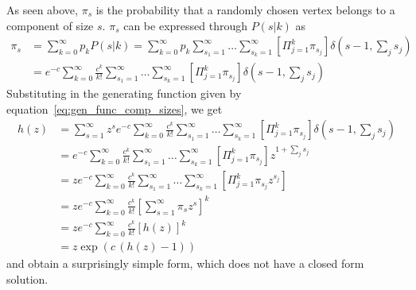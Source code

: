As seen above, $\pi_s$ is the probability that a randomly chosen vertex belongs to a component of size $s$.
$\pi_s$ can be expressed through $P(s|k)$ as
\begin{align}
	\pi_s & = \sum_{k=0}^\infty p_k P(s| k) = \sum_{k=0}^\infty p_k \sum_{s_1 = 1}^{\infty} \ldots \sum_{s_k = 1}^{\infty} \left[ \Pi_{j=1}^k \pi_{s_j} \right] \delta(s-1, \sum_j s_j) \\
	      & = e^{-c} \sum_{k=0}^\infty \frac{c^k}{k!} \sum_{s_1 = 1}^{\infty} \ldots \sum_{s_k = 1}^{\infty} \left[ \Pi_{j=1}^k \pi_{s_j} \right] \delta(s-1, \sum_j s_j)
\end{align}
Substituting in the generating function given by equation~\ref{eq:gen_func_comp_sizes}, we get
\begin{align}
	h(z) & = \sum_{s=1}^{\infty} z^s e^{-c} \sum_{k=0}^\infty \frac{c^k}{k!} \sum_{s_1 = 1}^{\infty} \ldots \sum_{s_k = 1}^{\infty} \left[ \Pi_{j=1}^k \pi_{s_j} \right] \delta(s-1, \sum_j s_j) \\
	     & = e^{-c} \sum_{k=0}^\infty \frac{c^k}{k!} \sum_{s_1 = 1}^{\infty} \ldots \sum_{s_k = 1}^{\infty} \left[ \Pi_{j=1}^k \pi_{s_j} \right] z^{1+\sum_j s_j} \\
	     & = z e^{-c} \sum_{k=0}^\infty \frac{c^k}{k!} \sum_{s_1 = 1}^{\infty} \ldots \sum_{s_k = 1}^{\infty} \left[ \Pi_{j=1}^k \pi_{s_j} z ^ {s_j}\right] \\
	     & = z e^{-c} \sum_{k=0}^\infty \frac{c^k}{k!} \left[ \sum_{s=1}^{\infty} \pi_s z^s \right]^k \\
	     & = z e^{-c} \sum_{k=0}^\infty \frac{c^k}{k!} \left[ h(z) \right]^k \\
	     & = z \exp\left( c\, (h(z) -1) \right)~\label{eq:h_z}
\end{align}
and obtain a surprisingly simple form, which does not have a closed form solution.

